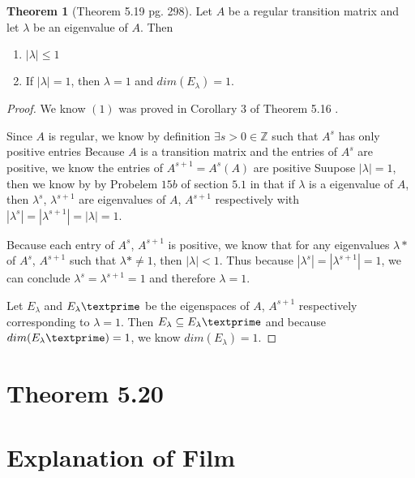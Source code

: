 \documentclass{amsart}
\theoremstyle{definition}
\newtheorem{theorem}{Theorem}
\theoremstyle{remark}
\numberwithin{equation}{section}
\begin{document}
\begin{theorem}[Theorem 5.19 pg. 298]
Let $A$ be a regular transition matrix and let $\lambda$ be an eigenvalue of $A$.  Then 

\begin{enumerate}
	\item $|\lambda| \leq 1$
	\item If $|\lambda| = 1$, then $\lambda = 1$ and $dim(E_{\lambda}) = 1$.

\end{enumerate}

\end{theorem}

\begin{proof}

We know $(1)$ was proved in Corollary 3 of Theorem 5.16 \cite{friedberg2003linear}.

Since $A$ is regular, we know by definition $\exists s > 0 \in \mathbb{Z}$ such that $A^s$ has only positive entries
Because $A$ is a transition matrix and the entries of $A^s$ are positive, we know the entries of $A^{s+1} = A^s(A)$ are positive 
Suupose $|\lambda| = 1$, then we know by by Probelem $15b$ of section $5.1$ in \cite{friedberg2003linear} that if $\lambda$ is a eigenvalue of $A$, then $\lambda^s$, $\lambda^{s+1}$ are eigenvalues of $A$, $A^{s+1}$ respectively with $ |\lambda^s |= |\lambda^{s+1} |= |\lambda| = 1$.

Because each entry of $A^s$, $A^{s+1}$ is positive, we know that for any eigenvalues $\lambda*$ of $A^s$, $A^{s+1}$ such that $\lambda* \neq 1$, then $|\lambda| < 1$.
Thus because $|\lambda^s |= |\lambda^{s+1} |= 1 $, we can conclude $\lambda^s = \lambda^{s+1} = 1$ and therefore $\lambda = 1$.

Let $E_{\lambda}$ and $E_{\lambda}\textprime$ be the eigenspaces of $A$, $A^{s+1}$ respectively corresponding to $\lambda = 1$.
Then $E_{\lambda} \subseteq E_{\lambda}\textprime$  and because $dim(E_{\lambda}\textprime) = 1$, we know $dim(E_{\lambda}) = 1$.


\end{proof}

\section{Theorem 5.20}





\section{Explanation of Film}


 
\end{document}
